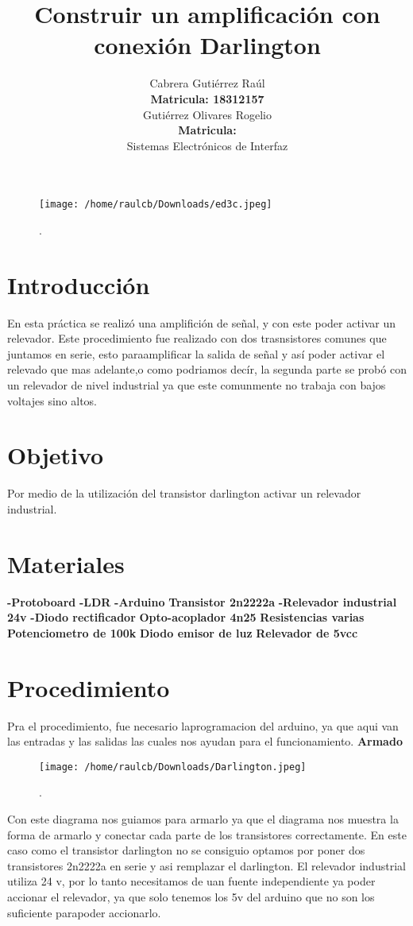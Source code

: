 \documentclass[11pt]{article}
\title{\textbf{Construir un amplificación con conexión Darlington}}
\author{Cabrera Gutiérrez Raúl\\
\textbf{ Matricula: 18312157}\\
Gutiérrez Olivares Rogelio\\
\textbf{Matricula: }\\
Sistemas Electrónicos de Interfaz\\}
\date{}
\begin{document}
\begin{figure}[htp]
\centering
\texttt{[image: /home/raulcb/Downloads/ed3c.jpeg]}
\caption{.}
\label{.}
\end{figure}
\maketitle

\section{Introducción}

En esta práctica se realizó una amplifición de señal, y con este poder activar un relevador. Este procedimiento fue realizado con dos trasnsistores comunes que juntamos en serie, esto paraamplificar la salida de señal y así poder activar el relevado que mas adelante,o como podriamos decír, la segunda parte se probó con un relevador de nivel industrial ya que este comunmente no trabaja con bajos voltajes sino altos.

\section{Objetivo}

Por medio de la utilización del transistor darlington activar un relevador industrial.
\section{Materiales}
\textbf{-Protoboard}
\textbf{-LDR}
\textbf{-Arduino}
\textbf{Transistor 2n2222a}
\textbf{-Relevador industrial 24v}
\textbf{-Diodo rectificador}
\textbf{Opto-acoplador 4n25}
\textbf{Resistencias varias}
\textbf{Potenciometro de 100k}
\textbf{Diodo emisor de luz}
\textbf{Relevador de 5vcc}

\section{Procedimiento}

Pra el procedimiento, fue necesario laprogramacion del arduino, ya que aqui van las entradas y las salidas las cuales nos ayudan para el funcionamiento.
\textbf{Armado}
\begin{figure}[htp]
\centering
\texttt{[image: /home/raulcb/Downloads/Darlington.jpeg]}
\caption{.}
\label{.}
\end{figure}

Con este diagrama nos guiamos para armarlo ya que el diagrama nos muestra la forma de armarlo y conectar cada parte de los transistores correctamente.
En este caso como el transistor darlington no se consiguio optamos por poner dos transistores 2n2222a en serie y asi remplazar el darlington. 
El relevador industrial utiliza 24 v, por lo tanto necesitamos de uan fuente independiente ya poder accionar el relevador, ya que solo tenemos los 5v del arduino que no son los suficiente parapoder accionarlo.
\end{document}
